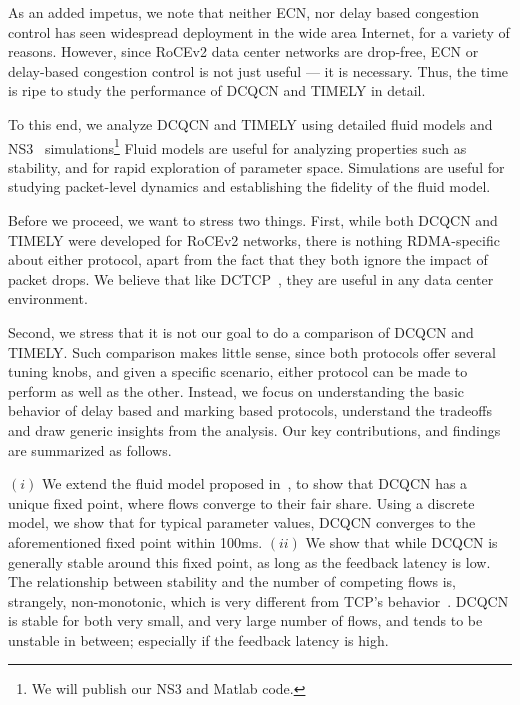 As an added impetus, we note that neither ECN, nor delay based congestion
control has seen widespread deployment in the wide area Internet, for a variety
of reasons.  However, since RoCEv2 data center networks are drop-free, ECN or
delay-based congestion control is not just useful --- it is necessary. Thus, the
time is ripe to study the performance of DCQCN and TIMELY in detail.


To this end, we analyze DCQCN and TIMELY using detailed fluid models and
NS3~\cite{NS3} simulations\footnote{We will publish our NS3 and Matlab code.}
Fluid models are useful for analyzing properties such as stability, and for
rapid exploration of parameter space.  Simulations are useful for studying
packet-level dynamics and establishing the fidelity of the fluid model. 


Before we proceed, we want to stress two things. First, while both DCQCN and
TIMELY were developed for RoCEv2 networks, there is nothing RDMA-specific about
either protocol, apart from the fact that they both ignore the impact of packet
drops. We believe that like DCTCP~\cite{dctcp}, they are useful in any data
center environment. 

Second, we stress that it is not our goal to do a comparison of DCQCN and
TIMELY.  Such comparison makes little sense, since both protocols offer several
tuning knobs, and given a specific scenario, either protocol can be made to
perform as well as the other. Instead, we focus on understanding the basic
behavior of delay based and marking based protocols, understand the tradeoffs
and draw generic insights from the analysis.  Our key contributions, and
findings are summarized as follows.

 $(i)$ We extend the fluid model proposed in~\cite{dcqcn}, to show
that DCQCN has a unique fixed point, where flows converge to their fair share.
Using a discrete model, we show that for typical parameter values, DCQCN
converges to the aforementioned fixed point within 100ms.  $(ii)$ We show that
while DCQCN is generally stable around this fixed point, as long as the feedback
latency is low. The relationship between stability and the number of competing
flows is, strangely, non-monotonic, which is very different from TCP's
behavior~\cite{misra:TAC2002}. DCQCN is stable for both very small, and very
large number of flows, and tends to be unstable in between; especially if the
feedback latency is high.

